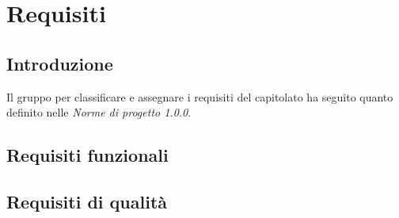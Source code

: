 \section{Requisiti}

\subsection{Introduzione}
Il gruppo \groupName per classificare e assegnare i requisiti del capitolato ha seguito quanto definito nelle \textit{Norme di progetto 1.0.0}.

\subsection{Requisiti funzionali}

\subsection{Requisiti di qualità}
